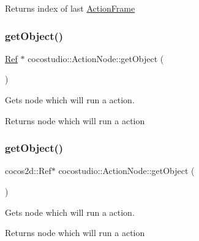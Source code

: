 \begin{DoxyReturn}{Returns}
index of last \hyperlink{classcocostudio_1_1ActionFrame}{Action\+Frame} 
\end{DoxyReturn}
\mbox{\label{classcocostudio_1_1ActionNode_a31e2f62798eb18f0e09c270688fb6e3d}} 
\subsubsection{\texorpdfstring{get\+Object()}{getObject()}\hspace{0.1cm}{\footnotesize\ttfamily [1/2]}}
{\footnotesize\ttfamily \hyperlink{classRef}{Ref} $\ast$ cocostudio\+::\+Action\+Node\+::get\+Object (\begin{DoxyParamCaption}{ }\end{DoxyParamCaption})}

Gets node which will run a action.

\begin{DoxyReturn}{Returns}
node which will run a action 
\end{DoxyReturn}
\mbox{\label{classcocostudio_1_1ActionNode_a5798b463abed6f9b01258a8a5e215fc9}} 
\subsubsection{\texorpdfstring{get\+Object()}{getObject()}\hspace{0.1cm}{\footnotesize\ttfamily [2/2]}}
{\footnotesize\ttfamily cocos2d\+::\+Ref$\ast$ cocostudio\+::\+Action\+Node\+::get\+Object (\begin{DoxyParamCaption}{ }\end{DoxyParamCaption})}

Gets node which will run a action.

\begin{DoxyReturn}{Returns}
node which will run a action 
\end{DoxyReturn}
\mbox{\label{classcocostudio_1_1ActionNode_a26e826ff6e9e705b81fe59a25a938367}} 
